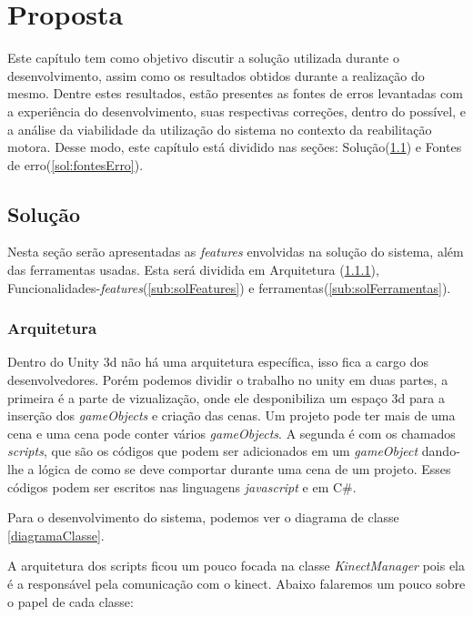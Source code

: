 \chapter[Proposta]{Proposta}\label{ch:proposta}
  Este capítulo tem como objetivo discutir a solução utilizada durante o
desenvolvimento, assim como os resultados obtidos durante a realização do mesmo. Dentre estes
resultados, estão presentes as fontes de erros levantadas com a experiência do desenvolvimento,
suas respectivas correções, dentro do possível, e a análise da viabilidade da utilização do
sistema no contexto da reabilitação motora. Desse modo, este
capítulo está dividido nas seções: Solução(\ref{sol:solucao}) e Fontes de erro(\ref{sol:fontesErro}).

\section{Solução}\label{sol:solucao}
  Nesta seção serão apresentadas as \textit{features} envolvidas na solução do sistema,
além das ferramentas usadas. Esta será dividida em Arquitetura (\ref{sub:arquitetura}), Funcionalidades-\textit{features}(\ref{sub:solFeatures}) e
ferramentas(\ref{sub:solFerramentas}).

\subsection{Arquitetura}\label{sub:arquitetura}
  Dentro do Unity 3d não há uma arquitetura específica, isso fica a cargo dos desenvolvedores. Porém podemos dividir o trabalho no unity em duas partes,
a primeira é a parte de vizualização, onde ele desponibiliza um espaço 3d para a inserção dos \textit{gameObjects} e criação das cenas. Um projeto pode
ter mais de uma cena e uma cena pode conter vários \textit{gameObjects}. A segunda é com os chamados \textit{scripts}, que são os códigos que podem
ser adicionados em um \textit{gameObject} dando-lhe a lógica de como se deve comportar durante uma cena de um projeto. Esses códigos podem ser escritos
nas linguagens \textit{javascript} e em C\#.

  Para o desenvolvimento do sistema, podemos ver o diagrama de classe \ref{diagramaClasse}.

  A arquitetura dos scripts ficou um pouco focada na classe \textit{KinectManager} pois ela é a responsável pela comunicação com o kinect.
Abaixo falaremos um pouco sobre o papel de cada classe:

